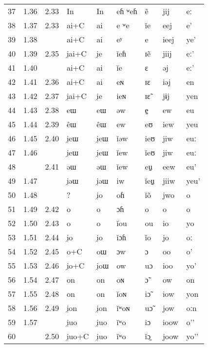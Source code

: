 \documentclass[oldfontcommands,twoside,a4paper,11pt,draft]{memoir}
\newcommand{\ipa}[1]{{\phon #1}} %
\begin{document}
\begin{longtable} {lllllllll}
37&	1.36&	2.33&	\ipa{In}&	\ipa{In}&	\ipa{eɦ ʷeɦ}&	\ipa{ẽ}&	\ipa{jij}&	\ipa{eː}\\	
38&	1.37&	2.33&	\ipa{ai+C}&	\ipa{ai}&	\ipa{e ʷe}&	\ipa{ǐe}&	\ipa{eej}&	\ipa{e’}\\	
39&	1.38&	&	\ipa{ai+C}&	\ipa{ai}&	\ipa{eʸ}&	\ipa{e}&	\ipa{ieej}&	\ipa{ye’}\\	
40&	1.39&	2.35&	\ipa{i̯ai+C}&	\ipa{i̯e}&	\ipa{ǐeɦ}&	\ipa{ɪẽ}&	\ipa{jiij}&	\ipa{eː’}\\	
41&	1.40&	&	\ipa{ai+C}&	\ipa{ai}&	\ipa{ǐe}&	\ipa{ɛ}&	\ipa{əj}&	\ipa{eː’}\\	
42&	1.41&	2.36&	\ipa{ai+C}&	\ipa{ai}&	\ipa{eɴ}&	\ipa{ɪɛ}&	\ipa{iəj}&	\ipa{en}\\	
43&	1.42&	2.37&	\ipa{i̯ai+C}&	\ipa{i̯e}&	\ipa{ieɴ}&	\ipa{ɪɛ̃}&	\ipa{jɨj}&	\ipa{yen}\\	
44&	1.43&	2.38&	\ipa{eɯ}&	\ipa{eɯ}&	\ipa{əw}&	\ipa{e̠}&	\ipa{ew}&	\ipa{eu}\\	
45&	1.44&	2.39&	\ipa{êɯ}&	\ipa{êɯ}&	\ipa{ew}&	\ipa{eʊ}&	\ipa{iew}&	\ipa{yeu}\\	
46&	1.45&	2.40&	\ipa{i̯eɯ}&	\ipa{i̯eɯ}&	\ipa{ǐəw}&	\ipa{ieʊ}&	\ipa{jiw}&	\ipa{euː}\\	
47&	1.46&	&	\ipa{i̯eɯ}&	\ipa{i̯eɯ}&	\ipa{ǐew}&	\ipa{ǐeʊ}&	\ipa{jiw}&	\ipa{euː}\\	
48&	&	2.41&	\ipa{əɯ}&	\ipa{əɯ}&	\ipa{ǐew}&	\ipa{eu̠}&	\ipa{eew}&	\ipa{eu’}\\	
49&	1.47&	&	\ipa{i̯əɯ}&	\ipa{i̯əɯ}&	\ipa{iw}&	\ipa{ǐeu̠}&	\ipa{jiiw}&	\ipa{yeu’}\\	
50&	1.48&	&	\ipa{?}&	\ipa{i̯o}&	\ipa{oɦ}&	\ipa{ǐõ}&	\ipa{jwo}&	\ipa{o}\\	
51&	1.49&	2.42&	\ipa{o}&	\ipa{o}&	\ipa{ɔɦ}&	\ipa{o}&	\ipa{o}&	\ipa{o}\\	
52&	1.50&	2.43&	\ipa{o}&	\ipa{o}&	\ipa{ǐou}&	\ipa{ou}&	\ipa{io}&	\ipa{yo}\\	
53&	1.51&	2.44&	\ipa{i̯o}&	\ipa{i̯o}&	\ipa{ǐɔɦ}&	\ipa{ǐo}&	\ipa{jo}&	\ipa{oː}\\	
54&	1.52&	2.45&	\ipa{o+C}&	\ipa{oɯ}&	\ipa{ɔw}&	\ipa{ɔ}&	\ipa{oo}&	\ipa{o’}\\	
55&	1.53&	2.46&	\ipa{i̯o+C}&	\ipa{i̯oɯ}&	\ipa{ow}&	\ipa{uɔ}&	\ipa{ioo}&	\ipa{yo’}\\	
56&	1.54&	2.47&	\ipa{on}&	\ipa{on}&	\ipa{oɴ}&	\ipa{ɔ̃}&	\ipa{ow}&	\ipa{on}\\	
57&	1.55&	2.48&	\ipa{on}&	\ipa{on}&	\ipa{ǐoɴ}&	\ipa{iɔ̃}&	\ipa{iow}&	\ipa{yon}\\	
58&	1.56&	2.49&	\ipa{i̯on}&	\ipa{i̯on}&	\ipa{ǐʷoɴ}&	\ipa{uɔ̃}&	\ipa{jow}&	\ipa{oːn}\\	
59&	1.57&	&	\ipa{i̯uo}&	\ipa{i̯uo}&	\ipa{ǐʷo}&	\ipa{iɔ}&	\ipa{ioow}&	\ipa{o’’}\\	
60&	&	2.50&	\ipa{i̯uo+C}&	\ipa{i̯uo}&	\ipa{ǐʷo}&	\ipa{ǐɔ̠}&	\ipa{joow}&	\ipa{yo’’}\\	\bottomrule
\end{longtable}
\end{document}
